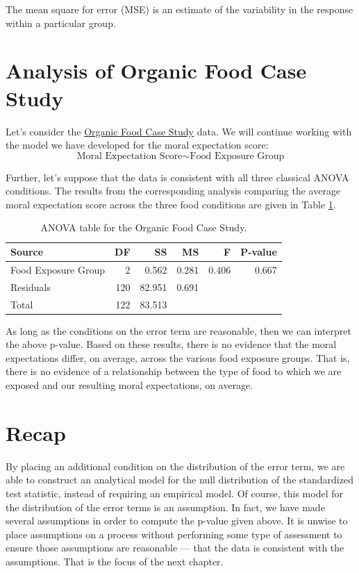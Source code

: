 \documentclass[]{book}
\theoremstyle{definition}
\theoremstyle{definition}
\theoremstyle{definition}
\theoremstyle{remark}
\let\BeginKnitrBlock\begin \let\EndKnitrBlock\end
\begin{document}
\BeginKnitrBlock{rmdtip}
The mean square for error (MSE) is an estimate of the variability in the
response within a particular group.
\EndKnitrBlock{rmdtip}

\section{Analysis of Organic Food Case
Study}\label{analysis-of-organic-food-case-study}

Let's consider the \protect\hyperlink{CaseOrganic}{Organic Food Case
Study} data. We will continue working with the model we have developed
for the moral expectation score:
\[\text{Moral Expectation Score} \sim \text{Food Exposure Group}\]

Further, let's suppose that the data is consistent with all three
classical ANOVA conditions. The results from the corresponding analysis
comparing the average moral expectation score across the three food
conditions are given in Table
\ref{tab:anovaclassical-organic-anova-table}.

\begin{table}

\caption{\label{tab:anovaclassical-organic-anova-table}ANOVA table for the Organic Food Case Study.}
\centering
\begin{tabular}[t]{l|r|r|r|r|r}
\hline
Source & DF & SS & MS & F & P-value\\
\hline
Food Exposure Group & 2 & 0.562 & 0.281 & 0.406 & 0.667\\
\hline
Residuals & 120 & 82.951 & 0.691 &  & \\
\hline
Total & 122 & 83.513 &  &  & \\
\hline
\end{tabular}
\end{table}

As long as the conditions on the error term are reasonable, then we can
interpret the above p-value. Based on these results, there is no
evidence that the moral expectations differ, on average, across the
various food exposure groups. That is, there is no evidence of a
relationship between the type of food to which we are exposed and our
resulting moral expectations, on average.

\section{Recap}\label{recap-1}

By placing an additional condition on the distribution of the error
term, we are able to construct an analytical model for the null
distribution of the standardized test statistic, instead of requiring an
empirical model. Of course, this model for the distribution of the error
terms is an assumption. In fact, we have made several assumptions in
order to compute the p-value given above. It is unwise to place
assumptions on a process without performing some type of assessment to
ensure those assumptions are reasonable --- that the data is consistent
with the assumptions. That is the focus of the next chapter.
\end{document}
